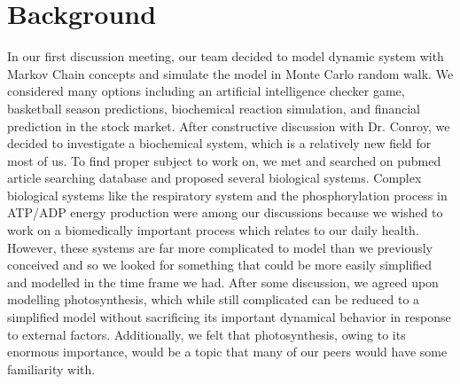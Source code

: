\documentclass[12pt,reqno]{amsart}
\begin{document}


	\section*{\large \textbf{Background}}
	
	
	
	In our first discussion meeting, our team decided to model 
	dynamic system with Markov Chain concepts and simulate the 
	model in Monte Carlo random walk. We considered many options 
	including an artificial intelligence checker game, basketball 
	season predictions, biochemical reaction simulation, and financial 
	prediction in the stock market. After constructive discussion with 
	Dr. Conroy, we decided to investigate a biochemical system, 
	which is a relatively new field for most of us. To find proper 
	subject to work on, we met and searched on pubmed article 
	searching database and proposed several biological systems. 
	Complex biological systems like the respiratory 
	system and the phosphorylation process in ATP/ADP energy production 
	were among our discussions because we wished to work on a biomedically 
	important process which relates to our daily health. However, 
	these systems are far more complicated to model than we previously 
	conceived and so we looked for something that could be more easily
	simplified and modelled in the time frame we had. After some 
	discussion, we agreed upon modelling photosynthesis, which while 
	still complicated can be reduced to a simplified model without sacrificing
	its important dynamical behavior in response to external factors. 
	Additionally, we felt that photosynthesis, owing to its enormous importance,
	would be a topic that many of our peers would have some familiarity with.		
	
\end{document}
